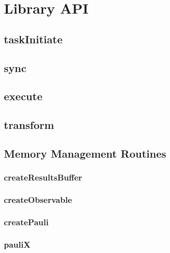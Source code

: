 \documentclass[10pt]{book}
\begin{document}
\section{\qcor Library API}\label{sec:qcor_library_api}
\subsection{\textbf{taskInitiate}}\label{subsec:taskInitiate}


\subsection{\textbf{sync}}\label{subsec:sync}


\subsection{\textbf{execute}}\label{subsec:execute}


\subsection{\textbf{transform}}\label{subsec:operatortransform}



\subsection{Memory Management Routines}
\subsubsection{\textbf{createResultsBuffer}}\label{subsec:createresbuf}


\subsubsection{\textbf{createObservable}}\label{subsec:createobserv}


\subsubsection{\textbf{createPauli}}\label{subsec:createpauli}


\subsubsection{\textbf{pauliX}}\label{subsec:paulix}

\end{document}
